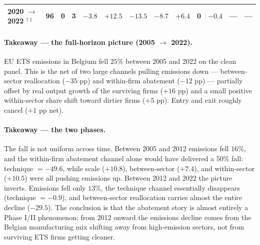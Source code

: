 \documentclass[11pt]{article}
\begin{document}
\begin{center}
\begin{tabular}{lrrrrrrrrrrrr}
2020 $\to$ 2022 $^{\dagger\ddagger}$  &  96 & 0 & 3 & $-3.8$  & $+12.5$ & $-13.5$ & $-8.7$  & $\mathbf{+6.4}$  & 0     & $-0.4$  & --- & --- \\
\bottomrule
\end{tabular}
\end{center}

\paragraph{Takeaway --- the full-horizon picture (2005 $\to$ 2022).} EU ETS emissions in Belgium fell $25\%$ between 2005 and 2022 on the clean panel. This is the net of two large channels pulling emissions down --- between-sector reallocation ($-35$ pp) and within-firm abatement ($-12$ pp) --- partially offset by real output growth of the surviving firms ($+16$ pp) and a small positive within-sector share shift toward dirtier firms ($+5$ pp). Entry and exit roughly cancel ($+1$ pp net).

\paragraph{Takeaway --- the two phases.} The fall is not uniform across time. Between 2005 and 2012 emissions fell $16\%$, and the within-firm abatement channel alone would have delivered a $50\%$ fall: technique $= -49.6$, while scale ($+10.8$), between-sector ($+7.4$), and within-sector ($+10.5$) were all pushing emissions up. Between 2012 and 2022 the picture inverts. Emissions fell only $13\%$, the technique channel essentially disappears (technique $= -0.9$), and between-sector reallocation carries almost the entire decline ($-29.5$). The conclusion is that the abatement story is almost entirely a Phase I/II phenomenon; from 2012 onward the emissions decline comes from the Belgian manufacturing mix shifting away from high-emission sectors, not from surviving ETS firms getting cleaner.
\end{document}
